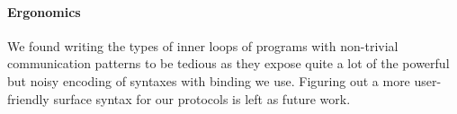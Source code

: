 \documentclass{easychair}
\begin{document}
\paragraph{Ergonomics}
We found writing the types of inner loops of programs with non-trivial
communication patterns to be tedious as they expose quite a lot of the
powerful but noisy encoding of syntaxes with binding we use.
Figuring out a more user-friendly surface syntax for our protocols is
left as future work.





\newpage

%
%
%

\end{document}
